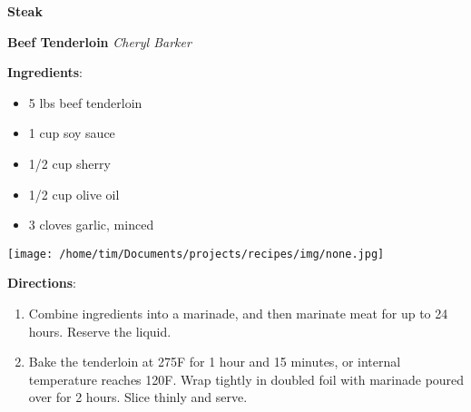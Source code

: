 \documentclass[11pt, twoside, openany]{book}
\begin{document}
{\newpage \LARGE \textbf{Steak}} \label{steak}\\
\noindent\begin{minipage}[t]{\linewidth}%
{\Large\textbf{Beef Tenderloin}} \label{beef-tenderloin}\hfill\textit{Cheryl Barker}\\
\noindent\begin{minipage}[t]{0.78\linewidth}%
\textbf{Ingredients}:\vspace{-3mm}
\begin{multicols}{2}
\begin{itemize}\setlength\itemsep{-1mm}
\item 5 lbs beef tenderloin
\item 1 cup soy sauce
\item 1/2 cup sherry
\item 1/2 cup olive oil
\item 3 cloves garlic, minced
\end{itemize}
\end{multicols}
\end{minipage}
\noindent\begin{minipage}[t]{0.18\linewidth}
\centering \strut\vspace*{-\baselineskip}\newline
\texttt{[image: /home/tim/Documents/projects/recipes/img/none.jpg]}\\
\end{minipage}\vspace{3mm}
\textbf{Directions}:
\vspace{-3mm}\begin{enumerate}\setlength\itemsep{-1mm}
\item Combine ingredients into a marinade, and then marinate meat for up to 24 hours. Reserve the liquid.
\item Bake the tenderloin at 275F for 1 hour and 15 minutes, or internal temperature reaches 120F. Wrap tightly in doubled foil with marinade poured over for 2 hours. Slice thinly and serve.
\end{enumerate}
\end{minipage}\vspace{8mm}
\end{document}
